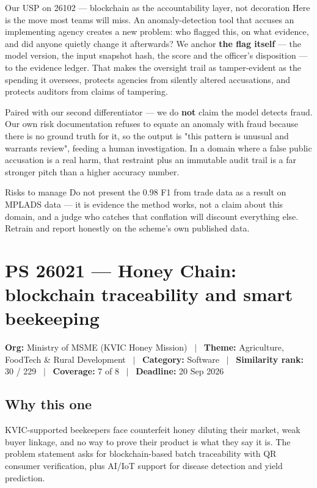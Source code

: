 \documentclass[11pt]{article}
\newcommand{\psbanner}[6]{%
  \vspace{0.2em}
  {\footnotesize\color{gxslate}\textbf{Org:} #1 \ $\vert$ \ \textbf{Theme:} #2 \ $\vert$ \ \textbf{Category:} #3 \ $\vert$ \ \textbf{Similarity rank:} #4 \ $\vert$ \ \textbf{Coverage:} #5 \ $\vert$ \ \textbf{Deadline:} #6}
  \par\vspace{0.6em}
}
\begin{document}
\begin{uspbox}{Our USP on 26102 --- blockchain as the accountability layer, not decoration}
Here is the move most teams will miss. An anomaly-detection tool that accuses an implementing agency
creates a new problem: who flagged this, on what evidence, and did anyone quietly change it afterwards?
We anchor \textbf{the flag itself} --- the model version, the input snapshot hash, the score and the
officer's disposition --- to the evidence ledger. That makes the oversight trail as tamper-evident as the
spending it oversees, protects agencies from silently altered accusations, and protects auditors from
claims of tampering.

\vspace{0.5em}
Paired with our second differentiator --- we do \textbf{not} claim the model detects fraud. Our own risk
documentation refuses to equate an anomaly with fraud because there is no ground truth for it, so the
output is "this pattern is unusual and warrants review", feeding a human investigation. In a domain where
a false public accusation is a real harm, that restraint plus an immutable audit trail is a far stronger
pitch than a higher accuracy number.
\end{uspbox}

\begin{warnbox}{Risks to manage}
Do not present the 0.98 F1 from trade data as a result on MPLADS data --- it is evidence the method works,
not a claim about this domain, and a judge who catches that conflation will discount everything else.
Retrain and report honestly on the scheme's own published data.
\end{warnbox}

\clearpage
\section{PS 26021 --- Honey Chain: blockchain traceability and smart beekeeping}
\psbanner{Ministry of MSME (KVIC Honey Mission)}{Agriculture, FoodTech \& Rural Development}{Software}{30 / 229}{7 of 8}{20 Sep 2026}

\subsection*{Why this one}
KVIC-supported beekeepers face counterfeit honey diluting their market, weak buyer linkage, and no way to
prove their product is what they say it is. The problem statement asks for blockchain-based batch
traceability with QR consumer verification, plus AI/IoT support for disease detection and yield
prediction.
\end{document}

